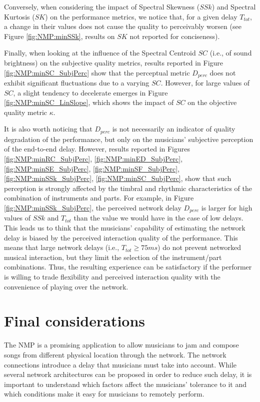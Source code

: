 Conversely, when considering the impact of Spectral Skewness ($SSk$) and Spectral Kurtosis ($SK$) on the performance metrics, we notice that, for a given delay $T_{tot}$, a change in their values does not cause the quality to perceivably worsen (see Figure \ref{fig:NMP:minSSk}, results on $SK$ not reported for conciseness). 

Finally, when looking at the influence of the Spectral Centroid $SC$ (i.e., of sound brightness) on the subjective quality metrics, results reported in Figure \ref{fig:NMP:minSC_SubjPerc} show that the perceptual metric $D_{perc}$ does not exhibit significant fluctuations due to a varying $SC$. However, for large values of $SC$, a slight tendency to decelerate emerges in Figure \ref{fig:NMP:minSC_LinSlope}, which shows the impact of $SC$ on the objective quality metric $\kappa$.

It is also worth noticing that $D_{perc}$ is not necessarily an indicator of quality degradation of the performance, but only on the musicians' subjective perception of the end-to-end delay. However, results reported in Figures \ref{fig:NMP:minRC_SubjPerc}, \ref{fig:NMP:minED_SubjPerc}, \ref{fig:NMP:minSE_SubjPerc}, \ref{fig:NMP:minSF_SubjPerc}, \ref{fig:NMP:minSSk_SubjPerc}, \ref{fig:NMP:minSC_SubjPerc}, show that such perception is strongly affected by the timbral and rhythmic characteristics of the combination of instruments and parts. For example, in Figure \ref{fig:NMP:minSSk_SubjPerc}, the perceived network delay $D_{perc}$ is larger for high values of $SSk$ and $T_{tot}$ than the value we would have in the case of low delays. This leads us to think that the musicians' capability of estimating the network delay is biased by the perceived interaction quality of the performance.
This means that large network delays (i.e., $T_{tot}\geq 75ms$) do not prevent networked musical interaction, but they limit the selection of the instrument/part combinations. Thus, the resulting experience can be satisfactory if the performer is willing to trade flexibility and perceived interaction quality with the convenience of playing over the network.

\section{Final considerations}\label{sec:NMP:conclusions}
The NMP is a promising application to allow musicians to jam and compose songs from different physical location through the network. The network connections introduce a delay that musicians must take into account. While several network architectures can be proposed in order to reduce such delay, it is important to understand which factors affect the musicians' tolerance to it and which conditions make it easy for musicians to remotely perform.

